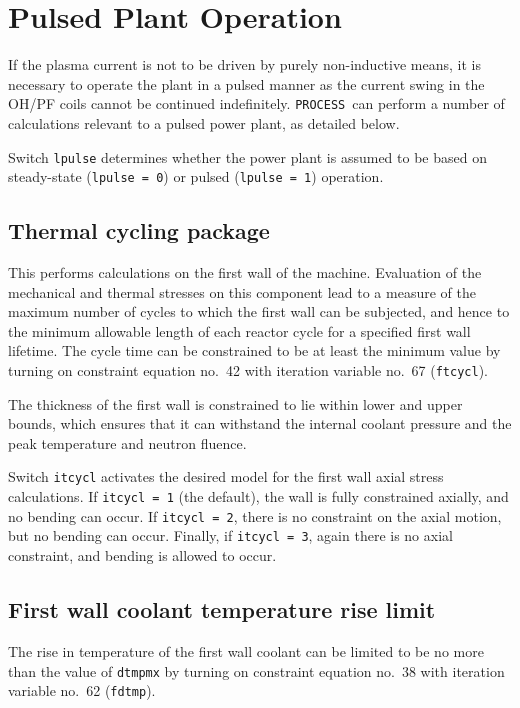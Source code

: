 \documentclass[11pt,a4paper]{report}
\newcommand{\process}{\mbox{\texttt{PROCESS}}}
\begin{document}
\section{Pulsed Plant Operation}
\label{sec:pulsed}

If the plasma current is not to be driven by purely non-inductive means, it is
necessary to operate the plant in a pulsed manner as the current swing in the
OH/PF coils cannot be continued indefinitely. \process\ can perform a number of
calculations relevant to a pulsed power plant, as detailed below.

Switch \texttt{lpulse} determines whether the power plant is assumed to be
based on steady-state (\texttt{lpulse = 0}) or pulsed (\texttt{lpulse = 1})
operation.

\subsection{Thermal cycling package}

This performs calculations on the first wall of the machine. Evaluation of the
mechanical and thermal stresses on this component lead to a measure of the
maximum number of cycles to which the first wall can be subjected, and hence
to the minimum allowable length of each reactor cycle for a specified first
wall lifetime. The cycle time can be constrained to be at least the minimum
value by turning on constraint equation no.\ 42 with iteration variable no.\
67 (\texttt{ftcycl}).

The thickness of the first wall is constrained to lie within lower and upper
bounds, which ensures that it can withstand the internal coolant pressure and
the peak temperature and neutron fluence.

Switch \texttt{itcycl} activates the desired model for the first wall axial
stress calculations. If \texttt{itcycl = 1} (the default), the wall is fully
constrained axially, and no bending can occur. If \texttt{itcycl = 2}, there
is no constraint on the axial motion, but no bending can occur. Finally, if
\texttt{itcycl = 3}, again there is no axial constraint, and bending is
allowed to occur.

\subsection{First wall coolant temperature rise limit}

The rise in temperature of the first wall coolant can be limited to be no more
than the value of \texttt{dtmpmx} by turning on constraint equation no.\ 38 with
iteration variable no.\ 62 (\texttt{fdtmp}).
\end{document}
